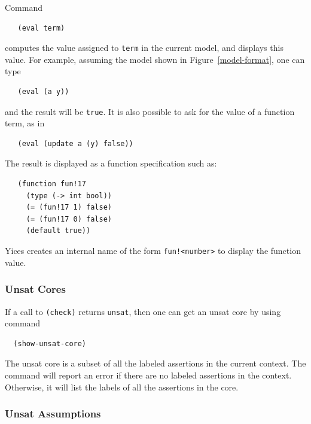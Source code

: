 \documentclass[11pt,twoside,fleqn,openright,titlepage]{cslreport}
\begin{document}
\medskip\noindent
Command
\begin{small}
\begin{verbatim}
   (eval term)
\end{verbatim}
\end{small}
computes the value assigned to \texttt{term} in the current model,
and displays this value. For example, assuming the model shown in
Figure~\ref{model-format}, one can type
\begin{small}
\begin{verbatim}
   (eval (a y))
\end{verbatim}
\end{small}
and the result will be \texttt{true}. It is also possible to ask for
the value of a function term, as in
\begin{small}
\begin{verbatim}
   (eval (update a (y) false))
\end{verbatim}
\end{small}
The result is displayed as a function specification such as:
\begin{small}
\begin{verbatim}
   (function fun!17
     (type (-> int bool))
     (= (fun!17 1) false)
     (= (fun!17 0) false)
     (default true))
\end{verbatim}
\end{small}
Yices creates an internal name of the form \texttt{fun!<number>} to
display the function value.




\subsubsection*{Unsat Cores}

If a call to \texttt{(check)} returns \texttt{unsat}, then one can get
an unsat core by using command
\begin{small}
\begin{verbatim}
  (show-unsat-core)
\end{verbatim}
\end{small}

\medskip\noindent
The unsat core is a subset of all the labeled assertions in the
current context. The command will report an error if there are no
labeled assertions in the context. Otherwise, it will list the labels
of all the assertions in the core.


\subsubsection*{Unsat Assumptions}
\end{document}
